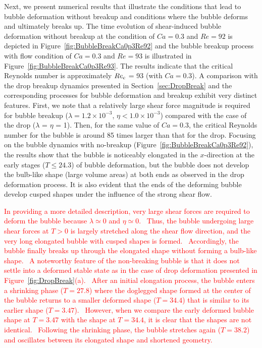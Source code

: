 \documentclass{elsarticle}
\begin{document}
%
Next, we present numerical results that illustrate the conditions that lead to bubble deformation without breakup and conditions where the bubble deforms and ultimately breaks up.  The time evolution of shear-induced bubble deformation without breakup at the condition of $Ca=0.3$ and $Re=92$ is depicted in Figure~\ref{fig:BubbleBreakCa0p3Re92} and the bubble breakup process with flow condition of $Ca=0.3$ and $Re=93$ is illustrated in Figure~\ref{fig:BubbleBreakCa0p3Re93}.  The results indicate that the critical Reynolds number is approximately $Re_{\rm c}$ = 93 (with $Ca=0.3$).  A comparison with the drop breakup dynamics presented in Section~\ref{sec:DropBreak} and the corresponding processes for bubble deformation and breakup exhibit very distinct features.  First, we note that a relatively large shear force magnitude is required for bubble breakup ($\lambda = 1.2 \times 10^{-3}$, $\eta < 1.0 \times 10^{-3}$) compared with the case of the drop ($\lambda$ = $\eta$ = 1). Then, for the same value of $Ca=0.3$, the critical Reynolds number for the bubble is around 85 times larger than that for the drop.  Focusing on the bubble dynamics with no-breakup (Figure~\ref{fig:BubbleBreakCa0p3Re92}), the results show that the bubble is noticeably elongated in the $x$-direction at the early stages ($T \leq 24.3$) of bubble deformation, but the bubble does not develop the bulb-like shape (large volume areas) at both ends as observed in the drop deformation process.  It is also evident that the ends of the deforming bubble develop cusped shapes under the influence of the strong shear flow.

\textcolor{red}
{
In providing a more detailed description, very large shear forces are required to deform the bubble because $\lambda \simeq 0$ and $\eta \simeq 0$.  Thus, the bubble undergoing large shear forces at $T > 0$ is largely stretched along the shear flow direction, and the very long elongated bubble with cusped shapes is formed.  Accordingly, the bubble finally breaks up through the elongated shape without forming a bulb-like shape.  A noteworthy feature of the non-breaking bubble is that it does not settle into a deformed stable state as in the case of drop deformation presented in Figure~\ref{fig:DropBreak}(a).  After an initial elongation process, the bubble enters a shrinking phase ($T = 27.8$) where the doglegged shape formed at the center of the bubble returns to a smaller deformed shape ($T = 34.4$) that is similar to its earlier shape ($T=3.47$).  However, when we compare the early deformed bubble shape at $T = 3.47$ with the shape at $T = 34.4$, it is clear that the shapes are not identical.  Following the shrinking phase, the bubble stretches again ($T = 38.2$) and oscillates between its elongated shape and shortened geometry.  
}
\end{document}
